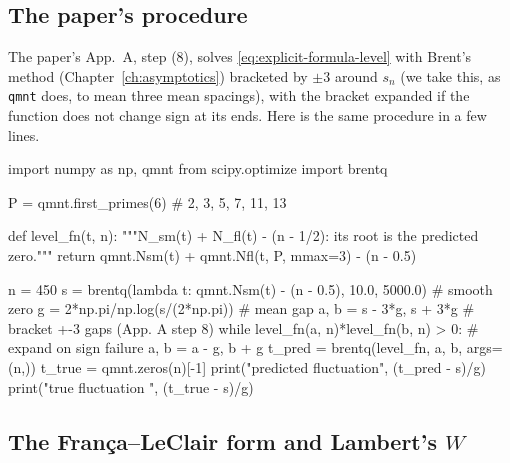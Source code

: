 \subsection{The paper's procedure}

The paper's App.~A, step (8), solves \cref{eq:explicit-formula-level} with Brent's method (Chapter~\ref{ch:asymptotics}) bracketed by $\pm3$ around $s_n$ (we take this, as \texttt{qmnt} does, to mean three mean spacings), with the bracket expanded if the function does not change sign at its ends. Here is the same procedure in a few lines.

\begin{pycode}
import numpy as np, qmnt
from scipy.optimize import brentq

P = qmnt.first_primes(6)                    # 2, 3, 5, 7, 11, 13

def level_fn(t, n):
    """N_sm(t) + N_fl(t) - (n - 1/2): its root is the predicted zero."""
    return qmnt.Nsm(t) + qmnt.Nfl(t, P, mmax=3) - (n - 0.5)

n = 450
s = brentq(lambda t: qmnt.Nsm(t) - (n - 0.5), 10.0, 5000.0)   # smooth zero
g = 2*np.pi/np.log(s/(2*np.pi))                             # mean gap
a, b = s - 3*g, s + 3*g                     # bracket +-3 gaps (App. A step 8)
while level_fn(a, n)*level_fn(b, n) > 0:     # expand on sign failure
    a, b = a - g, b + g
t_pred = brentq(level_fn, a, b, args=(n,))
t_true = qmnt.zeros(n)[-1]
print("predicted fluctuation", (t_pred - s)/g)
print("true fluctuation     ", (t_true - s)/g)
\end{pycode}

\subsection{The Fran\c{c}a--LeClair form and Lambert's $W$}

